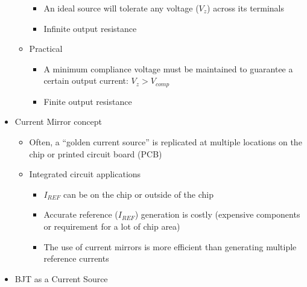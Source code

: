 \begin{itemize}
\begin{itemize}
\begin{itemize}
          \item An ideal source will tolerate any voltage ($V_z$) across its terminals

          \item Infinite output resistance

        \end{itemize}

      \item Practical

        \begin{itemize}

          \item A minimum compliance voltage must be maintained to guarantee a certain output current: $V_z>V_{comp}$

          \item Finite output resistance

        \end{itemize}

    \end{itemize}

  \item Current Mirror concept

    \begin{itemize}

      \item Often, a ``golden current source'' is replicated at multiple locations on the chip or printed circuit board (PCB)

      \item Integrated circuit applications

        \begin{itemize}

          \item $I_{REF}$ can be on the chip or outside of the chip

          \item Accurate reference ($I_{REF}$) generation is costly (expensive components or requirement for a lot of chip area)

          \item The use of current mirrors is more efficient than generating multiple reference currents

        \end{itemize}

    \end{itemize}

  \item BJT as a Current Source


\end{itemize}
